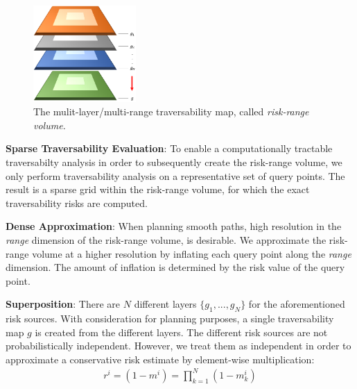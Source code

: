 \documentclass[letterpaper, 10pt, conference]{ieeeconf}      %
\newcommand{\ph}[1]{{\textbf{#1}:}} %
\newcommand{\rev}[1]{{\color{blue} #1 }} %
\begin{document}
\begin{figure}[thpb]
  \centering
  \includegraphics[width=0.35\textwidth]{spot_iros/graphics/layered_costmap.png}
  \caption{The mulit-layer/multi-range traversability map, called \emph{risk-range volume.}}
  \label{fig:layered_costmap}
\end{figure}

\ph{Sparse Traversability Evaluation}
To enable a computationally tractable traversabilty analysis in order to subsequently create the risk-range volume, we only perform traversability analysis on a representative set of query points.
The result is a sparse grid within the risk-range volume, for which the exact traversability risks are computed.


\ph{Dense Approximation}
When planning smooth paths, high resolution
in the \emph{range} dimension of the risk-range volume, is desirable.
We approximate the risk-range volume at a higher resolution by inflating each query point along the \emph{range} dimension.
The amount of inflation is determined by the risk value of the query point.


\ph{Superposition}
There are \rev{$N$}different \rev{layers} $\{g_1,...,g_N\}$ for the aforementioned risk sources.
With consideration for planning purposes,
a single traversability map $g$ is created from the different layers.
The different risk sources are not probabilistically independent. 
\rev{However, we treat them as independent in order to approximate a conservative risk estimate by element-wise multiplication:}
\begin{align}
r^i = (1-m^i) = \prod_{k=1}^N(1-m_k^{i})
\end{align}
\end{document}
